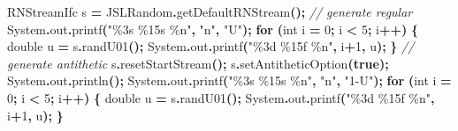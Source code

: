 \documentclass[
]{book}
\newenvironment{Shaded}{\begin{snugshade}}{\end{snugshade}}
\newcommand{\BuiltInTok}[1]{#1}
\newcommand{\CommentTok}[1]{\textcolor[rgb]{0.56,0.35,0.01}{\textit{#1}}}
\newcommand{\ControlFlowTok}[1]{\textcolor[rgb]{0.13,0.29,0.53}{\textbf{#1}}}
\newcommand{\DataTypeTok}[1]{\textcolor[rgb]{0.13,0.29,0.53}{#1}}
\newcommand{\DecValTok}[1]{\textcolor[rgb]{0.00,0.00,0.81}{#1}}
\newcommand{\FunctionTok}[1]{\textcolor[rgb]{0.00,0.00,0.00}{#1}}
\newcommand{\KeywordTok}[1]{\textcolor[rgb]{0.13,0.29,0.53}{\textbf{#1}}}
\newcommand{\NormalTok}[1]{#1}
\newcommand{\OperatorTok}[1]{\textcolor[rgb]{0.81,0.36,0.00}{\textbf{#1}}}
\newcommand{\SpecialCharTok}[1]{\textcolor[rgb]{0.00,0.00,0.00}{#1}}
\newcommand{\StringTok}[1]{\textcolor[rgb]{0.31,0.60,0.02}{#1}}
\theoremstyle{definition}
\theoremstyle{definition}
\theoremstyle{definition}
\theoremstyle{definition}
\theoremstyle{remark}
\begin{document}
\begin{Shaded}
\begin{Highlighting}[]
\NormalTok{RNStreamIfc s }\OperatorTok{=}\NormalTok{ JSLRandom}\OperatorTok{.}\FunctionTok{getDefaultRNStream}\OperatorTok{();}
\CommentTok{// generate regular}
\BuiltInTok{System}\OperatorTok{.}\FunctionTok{out}\OperatorTok{.}\FunctionTok{printf}\OperatorTok{(}\StringTok{"}\SpecialCharTok{\%3s}\StringTok{ }\SpecialCharTok{\%15s}\StringTok{ }\SpecialCharTok{\%n}\StringTok{"}\OperatorTok{,} \StringTok{"n"}\OperatorTok{,} \StringTok{"U"}\OperatorTok{);}
\ControlFlowTok{for} \OperatorTok{(}\DataTypeTok{int}\NormalTok{ i }\OperatorTok{=} \DecValTok{0}\OperatorTok{;}\NormalTok{ i }\OperatorTok{\textless{}} \DecValTok{5}\OperatorTok{;}\NormalTok{ i}\OperatorTok{++)} \OperatorTok{\{}
    \DataTypeTok{double}\NormalTok{ u }\OperatorTok{=}\NormalTok{ s}\OperatorTok{.}\FunctionTok{randU01}\OperatorTok{();}
    \BuiltInTok{System}\OperatorTok{.}\FunctionTok{out}\OperatorTok{.}\FunctionTok{printf}\OperatorTok{(}\StringTok{"}\SpecialCharTok{\%3d}\StringTok{ }\SpecialCharTok{\%15f}\StringTok{ }\SpecialCharTok{\%n}\StringTok{"}\OperatorTok{,}\NormalTok{ i}\OperatorTok{+}\DecValTok{1}\OperatorTok{,}\NormalTok{ u}\OperatorTok{);}
\OperatorTok{\}}
\CommentTok{// generate antithetic}
\NormalTok{s}\OperatorTok{.}\FunctionTok{resetStartStream}\OperatorTok{();}
\NormalTok{s}\OperatorTok{.}\FunctionTok{setAntitheticOption}\OperatorTok{(}\KeywordTok{true}\OperatorTok{);}
\BuiltInTok{System}\OperatorTok{.}\FunctionTok{out}\OperatorTok{.}\FunctionTok{println}\OperatorTok{();}
\BuiltInTok{System}\OperatorTok{.}\FunctionTok{out}\OperatorTok{.}\FunctionTok{printf}\OperatorTok{(}\StringTok{"}\SpecialCharTok{\%3s}\StringTok{ }\SpecialCharTok{\%15s}\StringTok{ }\SpecialCharTok{\%n}\StringTok{"}\OperatorTok{,} \StringTok{"n"}\OperatorTok{,} \StringTok{"1{-}U"}\OperatorTok{);}
\ControlFlowTok{for} \OperatorTok{(}\DataTypeTok{int}\NormalTok{ i }\OperatorTok{=} \DecValTok{0}\OperatorTok{;}\NormalTok{ i }\OperatorTok{\textless{}} \DecValTok{5}\OperatorTok{;}\NormalTok{ i}\OperatorTok{++)} \OperatorTok{\{}
    \DataTypeTok{double}\NormalTok{ u }\OperatorTok{=}\NormalTok{ s}\OperatorTok{.}\FunctionTok{randU01}\OperatorTok{();}
    \BuiltInTok{System}\OperatorTok{.}\FunctionTok{out}\OperatorTok{.}\FunctionTok{printf}\OperatorTok{(}\StringTok{"}\SpecialCharTok{\%3d}\StringTok{ }\SpecialCharTok{\%15f}\StringTok{ }\SpecialCharTok{\%n}\StringTok{"}\OperatorTok{,}\NormalTok{ i}\OperatorTok{+}\DecValTok{1}\OperatorTok{,}\NormalTok{ u}\OperatorTok{);}
\OperatorTok{\}}
\end{Highlighting}
\end{Shaded}
\end{document}
